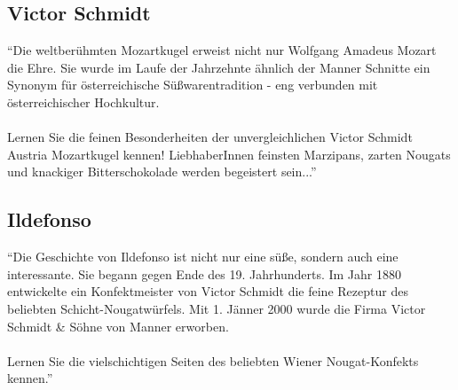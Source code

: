 \subsection{Victor Schmidt}
\enquote{Die weltberühmten Mozartkugel erweist nicht nur Wolfgang Amadeus Mozart die Ehre. Sie wurde im Laufe der Jahrzehnte ähnlich der Manner Schnitte ein Synonym für österreichische Süßwarentradition - eng verbunden mit österreichischer Hochkultur.\\\\
Lernen Sie die feinen Besonderheiten der unvergleichlichen Victor Schmidt Austria Mozartkugel kennen! LiebhaberInnen feinsten Marzipans, zarten Nougats und knackiger Bitterschokolade werden begeistert sein...}\cite{josef_manner_marken}

\subsection{Ildefonso}
\enquote{Die Geschichte von Ildefonso ist nicht nur eine süße, sondern auch eine interessante. Sie begann gegen Ende des 19. Jahrhunderts. Im Jahr 1880 entwickelte ein Konfektmeister von Victor Schmidt die feine Rezeptur des beliebten Schicht-Nougatwürfels. Mit 1. Jänner 2000 wurde die Firma Victor Schmidt \& Söhne von Manner erworben.\\\\
Lernen Sie die vielschichtigen Seiten des beliebten Wiener Nougat-Konfekts kennen.}\cite{josef_manner_marken}

